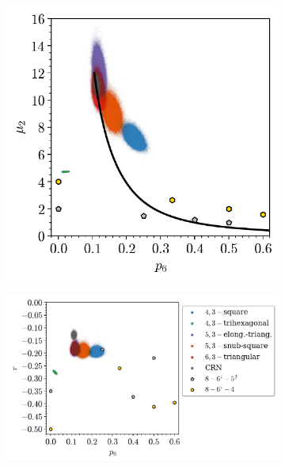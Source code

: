 \begin{figure}[bt]
     \centering
     
     \begin{subfigure}[b]{0.37\textwidth}
         \centering
         \includegraphics[width=\textwidth]{./figures/procrystals/pro3_p6_mu2.pdf}
         \caption{}
         \label{fig:pro3p6mu2}
     \end{subfigure}
     \hfill
     \begin{subfigure}[b]{0.61\textwidth}
         \centering
         \includegraphics[width=\textwidth]{./figures/procrystals/pro3_p6_r.pdf}
         \caption{}
         \label{fig:pro3p6r}
     \end{subfigure}
     

\end{figure}
